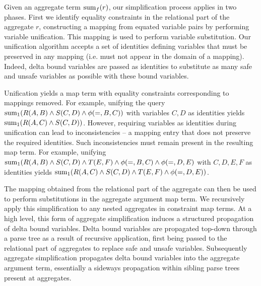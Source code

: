 Given an aggregate term $\mathrm{sum}_{f}(r)$, our simplification process applies in
two phases. First we identify equality constraints in the relational part of the
aggregate $r$, constructing a mapping from equated variable pairs by performing
variable unification. This mapping is used to perform variable substitution. Our
unification algorithm accepts a set of identities defining variables that must
be preserved in any mapping (i.e. must not appear in the domain of a
mapping). Indeed, delta bound variables are passed as identities to substitute
as many safe and unsafe variables as possible with these bound
variables.

Unification yields a map term with equality constraints corresponding
to mappings removed. 
For example, unifying the query
$\mathrm{sum}_{1}(R(A,B) \wedge S(C,D) \wedge \phi(=,B,C))$
with variables $C,D$ as identities yields $\mathrm{sum}_{1}(R(A,C) \wedge S(C,D))$.
However, requiring variables as identities during
unification can lead to inconsistencies -- a mapping entry that does not
preserve the required identities. Such inconsistencies must remain present in
the resulting map term.
For example, unifying
$\mathrm{sum}_{1}(R(A,B) \wedge S(C,D) \wedge T(E,F) \wedge \phi(=,B,C) \wedge
\phi(=,D,E)$ with $C,D,E,F$ as identities yields
 $\mathrm{sum}_{1}(R(A,C) \wedge S(C,D) \wedge T(E,F) \wedge \phi(=,D,E))$.

The mapping obtained from the relational part of the aggregate can then be used
to perform substitutions in the aggregate argument map term. We recursively
apply this simplification to any nested aggregates in constraint map terms.
At a high level, this form of aggregate simplification induces a structured
propagation of delta bound variables. Delta bound variables are propagated
top-down through a parse tree as a result of recursive application, first being
passed to the relational part of aggregates to replace safe and unsafe
variables. Subsequently aggregate simplification propagates delta bound
variables into the aggregate argument term, essentially a sideways propagation
within sibling parse trees present at aggregates.

